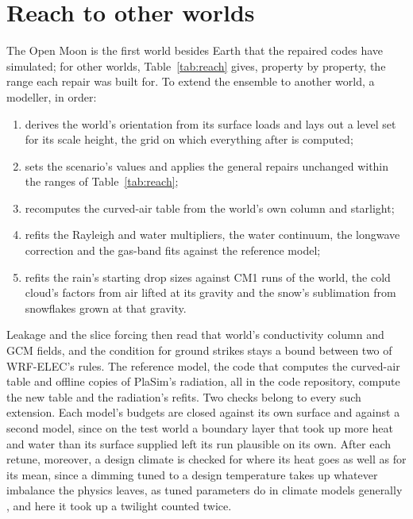 \section{Reach to other worlds}

The Open Moon is the first world besides Earth that the repaired codes have simulated; for other worlds,
Table~\ref{tab:reach} gives, property by property, the range each repair was built for. To extend the ensemble to
another world, a modeller, in order:
\begin{enumerate}
\item derives the world's orientation from its surface loads and lays out a level set for its scale height, the grid
  on which everything after is computed;
\item sets the scenario's values and applies the general repairs unchanged within the ranges of
  Table~\ref{tab:reach};
\item recomputes the curved-air table from the world's own column and starlight;
\item refits the Rayleigh and water multipliers, the water continuum, the longwave correction and the gas-band fits
  against the reference model;
\item refits the rain's starting drop sizes against CM1 runs of the world, the cold cloud's factors from air lifted
  at its gravity and the snow's sublimation from snowflakes grown at that gravity.
\end{enumerate}
Leakage and the slice forcing then read that world's conductivity column and GCM fields, and the condition for
ground strikes stays a bound between two of WRF-ELEC's rules. The reference model, the code that computes the
curved-air table and offline copies of PlaSim's radiation, all in the code repository, compute the new table and the
radiation's refits. Two checks belong to every such extension. Each model's budgets are closed against
its own surface and against a second model, since on the test world a boundary layer that took up more heat and
water than its surface supplied left its run plausible on its own. After each retune, moreover, a design
climate is checked for where its heat goes as well as for its mean, since a dimming tuned to a design temperature
takes up whatever imbalance the physics leaves, as tuned parameters do in climate models generally
\autocite{hourdin2017art}, and here it took up a twilight counted twice.

